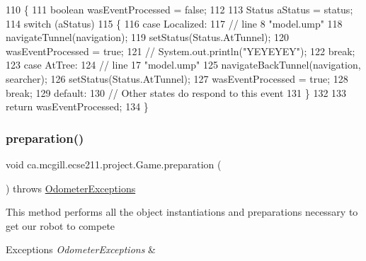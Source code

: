 \begin{DoxyCode}
110   \{
111     \textcolor{keywordtype}{boolean} wasEventProcessed = \textcolor{keyword}{false};
112     
113     Status aStatus = status;
114     \textcolor{keywordflow}{switch} (aStatus)
115     \{
116       \textcolor{keywordflow}{case} Localized:
117         \textcolor{comment}{// line 8 "model.ump"}
118         navigateTunnel(navigation);
119         setStatus(Status.AtTunnel);
120         wasEventProcessed = \textcolor{keyword}{true};
121        \textcolor{comment}{// System.out.println("YEYEYEY");}
122         \textcolor{keywordflow}{break};
123       \textcolor{keywordflow}{case} AtTree:
124         \textcolor{comment}{// line 17 "model.ump"}
125         navigateBackTunnel(navigation, searcher);
126         setStatus(Status.AtTunnel);
127         wasEventProcessed = \textcolor{keyword}{true};
128         \textcolor{keywordflow}{break};
129       \textcolor{keywordflow}{default}:
130         \textcolor{comment}{// Other states do respond to this event}
131     \}
132 
133     \textcolor{keywordflow}{return} wasEventProcessed;
134   \}
\end{DoxyCode}
\mbox{\label{enumca_1_1mcgill_1_1ecse211_1_1project_1_1_game_a8f3c5b18f98ee56f5f03afd72fa40bcb}} 
\subsubsection{\texorpdfstring{preparation()}{preparation()}}
{\footnotesize\ttfamily void ca.\+mcgill.\+ecse211.\+project.\+Game.\+preparation (\begin{DoxyParamCaption}{ }\end{DoxyParamCaption}) throws \hyperlink{classca_1_1mcgill_1_1ecse211_1_1odometer_1_1_odometer_exceptions}{Odometer\+Exceptions}}

This method performs all the object instantiations and preparations necessary to get our robot to compete


\begin{DoxyExceptions}{Exceptions}
{\em Odometer\+Exceptions} & \\
\hline
\end{DoxyExceptions}


